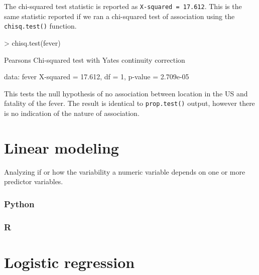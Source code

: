 \documentclass[
]{book}
\newenvironment{Shaded}{\begin{snugshade}}{\end{snugshade}}
\newcommand{\DecValTok}[1]{\textcolor[rgb]{0.00,0.00,0.81}{#1}}
\newcommand{\FloatTok}[1]{\textcolor[rgb]{0.00,0.00,0.81}{#1}}
\newcommand{\FunctionTok}[1]{\textcolor[rgb]{0.00,0.00,0.00}{#1}}
\newcommand{\NormalTok}[1]{#1}
\newcommand{\OtherTok}[1]{\textcolor[rgb]{0.56,0.35,0.01}{#1}}
\newcommand{\SpecialCharTok}[1]{\textcolor[rgb]{0.00,0.00,0.00}{#1}}
\newcommand{\StringTok}[1]{\textcolor[rgb]{0.31,0.60,0.02}{#1}}
\begin{document}
The chi-squared test statistic is reported as \texttt{X-squared\ =\ 17.612}. This is the same statistic reported if we ran a chi-squared test of association using the \texttt{chisq.test()} function.

\begin{Shaded}
\begin{Highlighting}[]
\SpecialCharTok{\textgreater{}} \FunctionTok{chisq.test}\NormalTok{(fever)}

\NormalTok{    Pearson}\StringTok{\textquotesingle{}s Chi{-}squared test with Yates\textquotesingle{}}\NormalTok{ continuity correction}

\NormalTok{data}\SpecialCharTok{:}\NormalTok{  fever}
\NormalTok{X}\SpecialCharTok{{-}}\NormalTok{squared }\OtherTok{=} \FloatTok{17.612}\NormalTok{, df }\OtherTok{=} \DecValTok{1}\NormalTok{, p}\SpecialCharTok{{-}}\NormalTok{value }\OtherTok{=} \FloatTok{2.709e{-}05}
\end{Highlighting}
\end{Shaded}

This tests the null hypothesis of no association between location in the US and fatality of the fever. The result is identical to \texttt{prop.test()} output, however there is no indication of the nature of association.

\hypertarget{linear-modeling}{%
\section{Linear modeling}\label{linear-modeling}}

Analyzing if or how the variability a numeric variable depends on one or more predictor variables.

\hypertarget{python-49}{%
\subsubsection*{Python}\label{python-49}}

\hypertarget{r-49}{%
\subsubsection*{R}\label{r-49}}

\hypertarget{logistic-regression}{%
\section{Logistic regression}\label{logistic-regression}}
\end{document}
